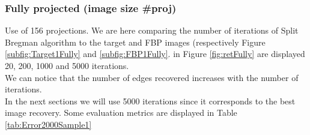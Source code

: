 \documentclass[10pt,a4paper,titlepage]{article}
\begin{document}
		\subsubsection{Fully projected (image size \#proj)}
			Use of 156 projections. We are here comparing the number of iterations of Split Bregman algorithm to the target and FBP images (respectively Figure \ref{subfig:Target1Fully} and \ref{subfig:FBP1Fully}. in Figure \ref{fig:retFully} are displayed 20, 200, 1000 and 5000 iterations.\\
			We can notice that the number of edges recovered increases with the number of iterations.\\
			In the next sections we will use 5000 iterations since it corresponds to the best image recovery.
			Some evaluation metrics are displayed in Table \ref{tab:Error2000Sample1}
		\begin{figure}[H]
		

\end{figure}
\end{document}
